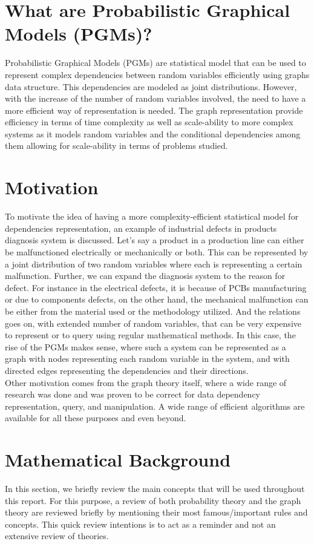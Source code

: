 \documentclass{article}
\begin{document}
\section{What are Probabilistic Graphical Models (PGMs)?}
Probabilistic Graphical Models (PGMs) are statistical model that can be used to represent complex dependencies between random variables efficiently using graphs data structure. This dependencies are modeled as joint distributions. However, with the increase of the number of random variables involved, the need to have a more efficient way of representation is needed. The graph representation provide efficiency in terms of time complexity as well as scale-ability to more complex systems as it models random variables and the conditional dependencies among them allowing for scale-ability in terms of problems studied.
\section{Motivation}
To motivate the idea of having a more complexity-efficient statistical model for dependencies representation, an example of industrial defects in products diagnosis system is discussed. Let's say a product in a production line can either be malfunctioned electrically or mechanically or both. This can be represented by a joint distribution of two random variables where each is representing a certain malfunction. Further, we can expand the diagnosis system to the reason for defect. For instance in the electrical defects, it is because of PCBs manufacturing or due to components defects, on the other hand, the mechanical malfunction can be either from the material used or the methodology utilized. And the relations goes on, with extended number of random variables, that can be very expensive to represent or to query using regular mathematical methods. In this case, the rise of the PGMs makes sense, where such a system can be represented as a graph with nodes representing each random variable in the system, and with directed edges representing the dependencies and their directions. \\
\indent Other motivation comes from the graph theory itself, where a wide range of research was done and was proven to be correct for data dependency representation, query, and manipulation. A wide range of efficient algorithms are available for all these purposes and even beyond.
\section{Mathematical Background}
In this section, we briefly review the main concepts that will be used throughout this report. For this purpose, a review of both probability theory and the graph theory are reviewed briefly by mentioning their most famous/important rules and concepts. This quick review intentions is to act as a reminder and not an extensive review of theories. 
\end{document}
